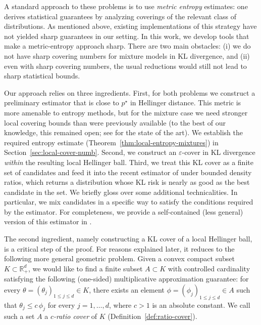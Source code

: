 \documentclass[11pt]{article}
\newcommand{\R}{\mathbb R}
\renewcommand{\leq}{\leqslant}
\newcommand{\eps}{\varepsilon}
\theoremstyle{definition}
\theoremstyle{remark}
\begin{document}
A standard approach to these problems is to use \textit{metric entropy} estimates: one derives statistical guarantees by analyzing coverings of the relevant class of distributions. As mentioned above, existing implementations of this strategy have not yielded sharp guarantees in our setting. In this work, we develop tools that make a metric-entropy approach sharp. There are two main obstacles: (i) we do not have sharp covering numbers for mixture models in KL divergence, and (ii) even with sharp covering numbers, the usual reductions would still not lead to sharp statistical bounds.

Our approach relies on three ingredients.
First, for both problems we construct a preliminary estimator that is close to $p^\star$ in Hellinger distance.
This metric is more amenable to entropy methods, but for the mixture case we need stronger local covering bounds than were previously available (to the best of our knowledge, this remained open; see \cite{baraud2018rho} for the state of the art). We establish the required entropy estimate (Theorem~\ref{thm:local-entropy-mixtures}) in Section~\ref{sec:local-cover-numb}.
Second, we construct an $\eps$-cover in KL divergence \emph{within} the resulting local Hellinger ball.
Third, we treat this KL cover as a finite set of candidates and feed it into the recent estimator of \cite{vanderhoeven2023high} under bounded density ratios, which returns a distribution whose KL risk is nearly as good as the best candidate in the set.
We briefly gloss over some additional technicalities. In particular, we mix candidates in a specific way to satisfy the conditions required by the estimator. For completeness, we provide a self-contained (less general) version of this estimator in .

The second ingredient, namely constructing a KL cover of a local Hellinger ball, is a critical step of the proof.
For reasons explained later, it reduces to the following more general geometric problem.
Given a convex compact subset $K \subset \R_+^d$, we would like to find a finite subset $A \subset K$ with controlled cardinality satisfying the following (one-sided) multiplicative approximation guarantee: for every $\theta = (\theta_j)_{1 \leq j \leq d} \in K$, there exists an element $\phi = (\phi_{j})_{1 \leq j \leq d} \in A$ such that $\theta_j \leq c \, \phi_j$ for every $j = 1, \dots, d$, where $c > 1$ is an absolute constant.
We call such a set $A$ a \emph{$c$-ratio cover} of $K$ (Definition~\ref{def:ratio-cover}).
\end{document}
